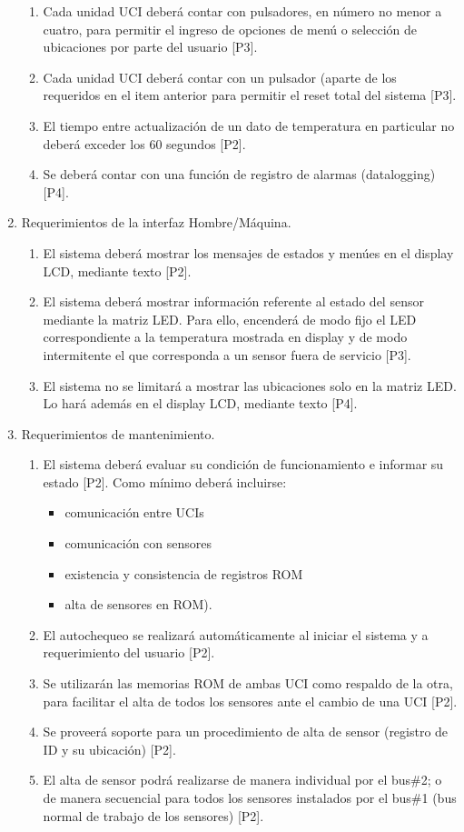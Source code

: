 \documentclass[
11pt, %
codirector, %
]{charter}
\begin{document}
\begin{enumerate}
\begin{enumerate}
		\item Cada unidad UCI deberá contar con pulsadores, en número no menor a cuatro, para permitir el ingreso de opciones de menú o selección de ubicaciones por parte del usuario [P3].
\item Cada unidad UCI deberá contar con un pulsador (aparte de los requeridos en el item anterior para permitir el reset total del sistema [P3].
\item El tiempo entre actualización de un dato de temperatura en particular no deberá exceder los 60 segundos [P2].
\item Se deberá contar con una función de registro de alarmas (datalogging) [P4].
\end{enumerate}



		\item Requerimientos de la interfaz Hombre/Máquina.
		
\begin{enumerate}
\item El sistema deberá mostrar los mensajes de estados y menúes en el display LCD, mediante texto [P2].
\item El sistema deberá mostrar información referente al estado del sensor mediante la matriz LED. Para ello, encenderá de modo fijo el LED correspondiente a la temperatura mostrada en display y de modo intermitente el que corresponda a un sensor fuera de servicio [P3].
\item El sistema no se limitará a mostrar las ubicaciones solo en la matriz LED. Lo hará además en el display LCD, mediante texto [P4].
\end{enumerate}

		
		\item Requerimientos de mantenimiento.
\begin{enumerate}
\item El sistema deberá evaluar su condición de funcionamiento e informar su estado [P2]. Como mínimo deberá incluirse:
\begin {itemize}
	\item comunicación entre UCIs
	\item comunicación con sensores
	\item existencia y consistencia de registros ROM
	\item alta de sensores en ROM).
\end{itemize}
\item El autochequeo se realizará automáticamente al iniciar el sistema y a requerimiento del usuario [P2]. 
\item Se utilizarán las memorias ROM de ambas UCI como respaldo de la otra, para facilitar el alta de todos los sensores ante el cambio de una UCI [P2].
\item Se proveerá soporte para un procedimiento de alta de sensor (registro de ID y su ubicación) [P2].
\item El alta de sensor podrá realizarse de manera individual por el bus\#2; o de manera secuencial para todos los sensores instalados por el bus\#1 (bus normal de trabajo de los sensores) [P2]. 
\end{enumerate}		


\end{enumerate}
\end{document}
